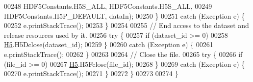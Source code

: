 \begin{DoxyCode}
00248                         HDF5Constants.H5S\_ALL, HDF5Constants.H5S\_ALL,
00249                         HDF5Constants.H5P\_DEFAULT, dataIn);
00250         \}
00251         \textcolor{keywordflow}{catch} (Exception e) \{
00252             e.printStackTrace();
00253         \}
00254 
00255         \textcolor{comment}{// End access to the dataset and release resources used by it.}
00256         \textcolor{keywordflow}{try} \{
00257             \textcolor{keywordflow}{if} (dataset\_id >= 0)
00258                 \hyperlink{namespace_h5}{H5}.H5Dclose(dataset\_id);
00259         \}
00260         \textcolor{keywordflow}{catch} (Exception e) \{
00261             e.printStackTrace();
00262         \}
00263 
00264         \textcolor{comment}{// Close the file.}
00265         \textcolor{keywordflow}{try} \{
00266             \textcolor{keywordflow}{if} (file\_id >= 0)
00267                 \hyperlink{namespace_h5}{H5}.H5Fclose(file\_id);
00268         \}
00269         \textcolor{keywordflow}{catch} (Exception e) \{
00270             e.printStackTrace();
00271         \}
00272     \}
00273 
00274 \}
\end{DoxyCode}
